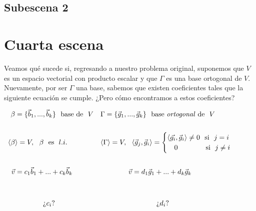 \documentclass[12pt,dvipsnames]{article}
\numberwithin{equation}{section}
\begin{document}


\subsection*{Subescena 2} \label{Ssec: Subescena 2}


\newpage
\section{Cuarta escena}

Veamos qué sucede si, regresando a nuestro problema original, suponemos que $V$ es un espacio vectorial con producto escalar y que $\Gamma$ es una base ortogonal de $V$. Nuevamente, por ser $\Gamma$ una base, sabemos que existen coeficientes tales que la siguiente ecuación se cumple. ¿Pero cómo encontramos a estos coeficientes?

\begin{align*}
    \beta&=\{\vec{b}_1,...,\vec{b}_k\} \ \ \text{base de} \ \ V& &\Gamma=\{\vec{g}_1,...,\vec{g}_k\} \ \ \text{base \emph{ortogonal} de} \ \ V& & &\\
    \\
    \langle\beta&\rangle = V, \ \ \beta \ \ \text{es} \ \ l.i.& &\langle\Gamma\rangle = V, \ \ \langle \vec{g}_j , \vec{g}_i \rangle = \begin{cases} \langle\vec{g_i}, \vec{g}_i\rangle\neq0 \ \ \text{si} \ \ j = i \\ \quad 0 \quad \ \ \ \ \ \ \ \ \ \text{si} \ \ j\neq i \end{cases}& & &\\
    \\
    \vec{v}&= c_1\vec{b}_1 + ... + c_k\vec{b}_k& &\quad \quad \quad \quad \vec{v}= d_1\vec{g}_1 + ... + d_k\vec{g}_k& & & \\
    \\
    \\
    &\quad \quad \quad \quad \text{¿}c_i\text{?}& & \quad \quad \quad \quad \quad \quad \quad \quad \text{¿}d_i\text{?} & & &
\end{align*}
\end{document}
